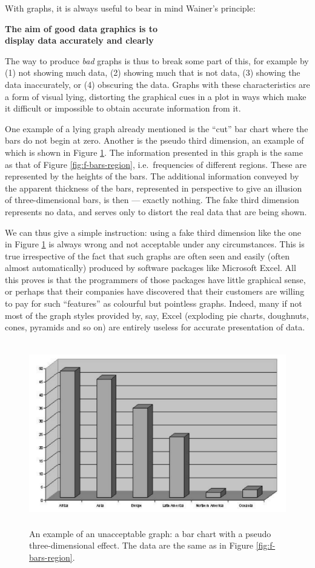 \documentclass[11pt,a4paper,openany]{book}
\begin{document}
With graphs, it is always useful to bear in mind Wainer's principle:

\textbf{The aim of good data graphics is to}\\
\textbf{display data accurately and clearly}

The way to produce \emph{bad} graphs is thus to break some part of this,
for example by (1) not showing much data, (2) showing much that is not
data, (3) showing the data inaccurately, or (4) obscuring the data.
Graphs with these characteristics are a form of visual lying, distorting
the graphical cues in a plot in ways which make it difficult or
impossible to obtain accurate information from it.

One example of a lying graph already mentioned is the ``cut'' bar chart
where the bars do not begin at zero. Another is the pseudo third
dimension, an example of which is shown in Figure \ref{fig:f-yuk}. The
information presented in this graph is the same as that of Figure
\ref{fig:f-bars-region}, i.e.~frequencies of different regions. These
are represented by the heights of the bars. The additional information
conveyed by the apparent thickness of the bars, represented in
perspective to give an illusion of three-dimensional bars, is then ---
exactly nothing. The fake third dimension represents no data, and serves
only to distort the real data that are being shown.

We can thus give a simple instruction: using a fake third dimension like
the one in Figure \ref{fig:f-yuk} is always wrong and not acceptable
under any circumstances. This is true irrespective of the fact that such
graphs are often seen and easily (often almost automatically) produced
by software packages like Microsoft Excel. All this proves is that the
programmers of those packages have little graphical sense, or perhaps
that their companies have discovered that their customers are willing to
pay for such ``features'' as colourful but pointless graphs. Indeed,
many if not most of the graph styles provided by, say, Excel (exploding
pie charts, doughnuts, cones, pyramids and so on) are entirely useless
for accurate presentation of data.

\begin{figure}[htbp]
\centering
\includegraphics[height=8.00000cm]{threeD.pdf}
\caption{\label{fig:f-yuk} An example of an unacceptable graph: a bar chart
with a pseudo three-dimensional effect. The data are the same as in
Figure \ref{fig:f-bars-region}.}
\end{figure}
\end{document}
